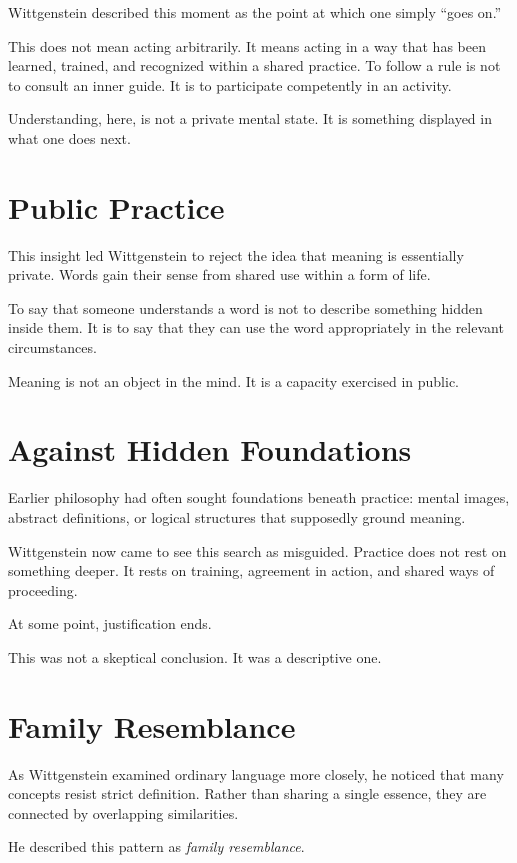 \documentclass[11pt]{article}
\begin{document}
Wittgenstein described this moment as the point at which one simply “goes on.”

This does not mean acting arbitrarily. It means acting in a way that has been learned, trained, and recognized within a shared practice. To follow a rule is not to consult an inner guide. It is to participate competently in an activity.

Understanding, here, is not a private mental state. It is something displayed in what one does next.

\section*{Public Practice}

This insight led Wittgenstein to reject the idea that meaning is essentially private. Words gain their sense from shared use within a form of life.

To say that someone understands a word is not to describe something hidden inside them. It is to say that they can use the word appropriately in the relevant circumstances.

Meaning is not an object in the mind. It is a capacity exercised in public.

\section*{Against Hidden Foundations}

Earlier philosophy had often sought foundations beneath practice: mental images, abstract definitions, or logical structures that supposedly ground meaning.

Wittgenstein now came to see this search as misguided. Practice does not rest on something deeper. It rests on training, agreement in action, and shared ways of proceeding.

At some point, justification ends.

This was not a skeptical conclusion. It was a descriptive one.

\section*{Family Resemblance}

As Wittgenstein examined ordinary language more closely, he noticed that many concepts resist strict definition. Rather than sharing a single essence, they are connected by overlapping similarities.

He described this pattern as \emph{family resemblance}.
\end{document}
